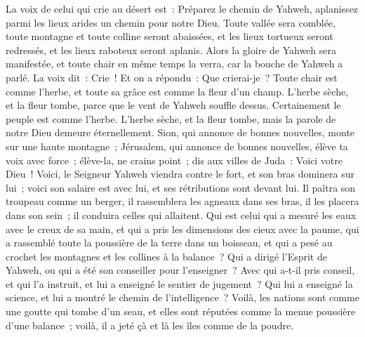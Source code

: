 \begin{multicols}{2}
La voix de celui qui crie au désert est~: Préparez le chemin de Yahweh, aplanissez parmi les lieux arides un chemin pour notre Dieu.
Toute vallée sera comblée, toute montagne et toute colline seront abaissées, et les lieux tortueux seront redressés, et les lieux raboteux seront aplanis.
Alors la gloire de Yahweh sera manifestée, et toute chair en même temps la verra, car la bouche de Yahweh a parlé.
La voix dit~: Crie~! Et on a répondu~: Que crierai-je~? Toute chair est comme l'herbe, et toute sa grâce est comme la fleur d'un champ.
L'herbe sèche, et la fleur tombe, parce que le vent de Yahweh souffle dessus. Certainement le peuple est comme l'herbe.
L'herbe sèche, et la fleur tombe, mais la parole de notre Dieu demeure éternellement.
Sion, qui annonce de bonnes nouvelles, monte sur une haute montagne~; Jérusalem, qui annonce de bonnes nouvelles, élève ta voix avec force~; élève-la, ne crains point~; dis aux villes de Juda~: Voici votre Dieu~!
Voici, le Seigneur Yahweh viendra contre le fort, et son bras dominera sur lui~; voici son salaire est avec lui, et ses rétributions sont devant lui.
Il paîtra son troupeau comme un berger, il rassemblera les agneaux dans ses bras, il les placera dans son sein~; il conduira celles qui allaitent.
Qui est celui qui a mesuré les eaux avec le creux de sa main, et qui a pris les dimensions des cieux avec la paume, qui a rassemblé toute la poussière de la terre dans un boisseau, et qui a pesé au crochet les montagnes et les collines à la balance~?
Qui a dirigé l'Esprit de Yahweh, ou qui a été son conseiller pour l'enseigner~?
Avec qui a-t-il pris conseil, et qui l'a instruit, et lui a enseigné le sentier de jugement~? Qui lui a enseigné la science, et lui a montré le chemin de l'intelligence~?
Voilà, les nations sont comme une goutte qui tombe d'un seau, et elles sont réputées comme la menue poussière d'une balance~; voilà, il a jeté çà et là les îles comme de la poudre.

\end{multicols}
